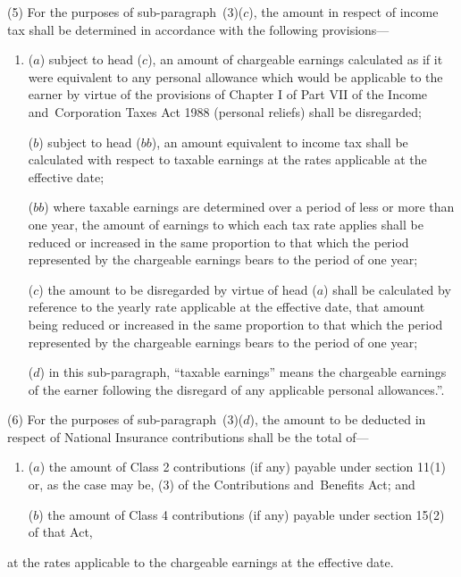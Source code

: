 \documentclass[12pt,a4paper]{article}
\begin{document}
(5) For the purposes of sub-paragraph~(3)($c$), the amount in respect of income tax shall be determined in accordance with the following provisions—
\begin{enumerate}\item[]
($a$) subject to head ($c$), an amount of chargeable earnings 
calculated as if it were equivalent to any personal allowance which would be  %
applicable to the earner by virtue of the provisions of Chapter I of Part VII of the Income and~Corporation Taxes Act 1988 (personal reliefs) shall be disregarded;

($b$) 
subject to head ($bb$),  %
an amount equivalent to income tax shall be calculated with respect to taxable earnings at the rates applicable at the effective date;

($bb$) where taxable earnings are determined over a period of less or more than one year, the amount of earnings to which each tax rate applies shall be reduced or increased in the same proportion to that which the period represented by the chargeable earnings bears to the period of one year;

($c$) the amount to be disregarded by virtue of head ($a$) shall be calculated by reference to the yearly rate applicable at the effective date, that amount being reduced or increased in the same proportion to that which the period represented by the chargeable earnings bears to the period of one year;

($d$) in this sub-paragraph, “taxable earnings” means the chargeable earnings of the earner following the disregard of any applicable personal allowances.”.
\end{enumerate}

(6) For the purposes of sub-paragraph~(3)($d$), the amount to be deducted in respect of National Insurance contributions shall be the total of—
\begin{enumerate}\item[]
($a$) the amount of Class 2 contributions (if any) payable under section 11(1) or, as the case may be, 
(3)  %
of the Contributions and~Benefits Act; and

($b$) the amount of Class 4 contributions (if any) payable under section 15(2) of that Act,
\end{enumerate}
at the rates applicable 
to the chargeable earnings %
at the effective date.
\end{document}
